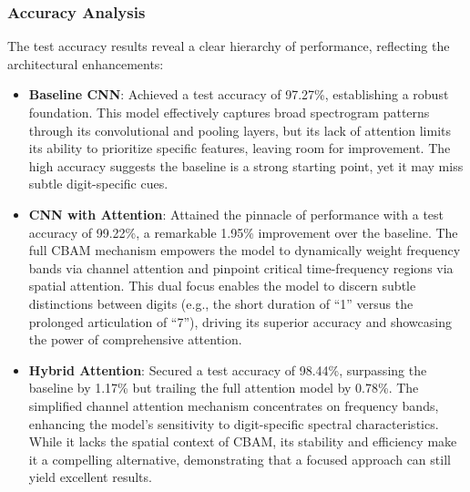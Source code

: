 \documentclass[12pt]{article}
\begin{document}
\newpage
\subsubsection{Accuracy Analysis}
The test accuracy results reveal a clear hierarchy of performance, reflecting the architectural enhancements:
\begin{itemize}
    \item \textbf{Baseline CNN}: Achieved a test accuracy of 97.27\%, establishing a robust foundation. This model effectively captures broad spectrogram patterns through its convolutional and pooling layers, but its lack of attention limits its ability to prioritize specific features, leaving room for improvement. The high accuracy suggests the baseline is a strong starting point, yet it may miss subtle digit-specific cues.
    \item \textbf{CNN with Attention}: Attained the pinnacle of performance with a test accuracy of 99.22\%, a remarkable 1.95\% improvement over the baseline. The full CBAM mechanism empowers the model to dynamically weight frequency bands via channel attention and pinpoint critical time-frequency regions via spatial attention. This dual focus enables the model to discern subtle distinctions between digits (e.g., the short duration of ``1'' versus the prolonged articulation of ``7''), driving its superior accuracy and showcasing the power of comprehensive attention.
    \item \textbf{Hybrid Attention}: Secured a test accuracy of 98.44\%, surpassing the baseline by 1.17\% but trailing the full attention model by 0.78\%. The simplified channel attention mechanism concentrates on frequency bands, enhancing the model's sensitivity to digit-specific spectral characteristics. While it lacks the spatial context of CBAM, its stability and efficiency make it a compelling alternative, demonstrating that a focused approach can still yield excellent results.
\end{itemize}
\end{document}
